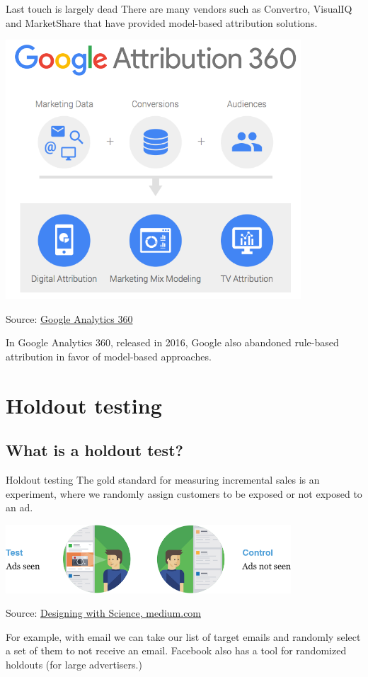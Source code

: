\documentclass[10pt, aspectratio=169]{beamer}
\newcommand{\source}[1]{\begin{flushright} \footnotesize Source: {#1} \end{flushright} \normalsize}
\begin{document}
\begin{frame}{Last touch is largely dead}
There are many vendors such as Convertro, VisualIQ and MarketShare that have provided model-based attribution solutions.
\begin{center}
\includegraphics[height=0.5\textheight]{images/attribution360.png}
\source{\href{https://www.google.com/analytics/attribution/capabilities/}{Google Analytics 360}}
\end{center}
In Google Analytics 360, released in 2016, Google also abandoned rule-based attribution in favor of model-based approaches.
\end{frame}

\section{Holdout testing}

\subsection{What is a holdout test?}

\begin{frame}{Holdout testing}
The gold standard for measuring incremental sales is an experiment, where we \alert{randomly} assign customers to be exposed or not exposed to an ad.\\
\begin{center}
\includegraphics[width=0.8\textwidth]{images/test_control.png}
\end{center}
\source{\href{https://goo.gl/gO5Pbl}{Designing with Science, medium.com}}
For example, with email we can take our list of target emails and randomly select a set of them to not receive an email. Facebook also has a tool for randomized holdouts (for large advertisers.)
\end{frame}
\end{document}
